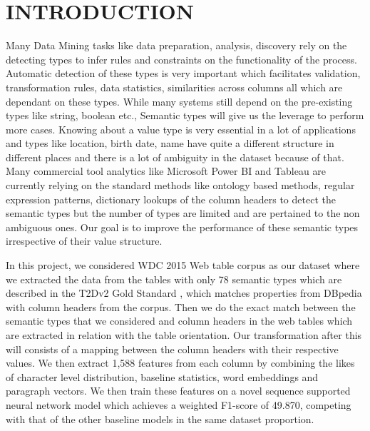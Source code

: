 \documentclass[12pt, a4paper]{report}
\theoremstyle{definition}
\numberwithin{equation}{chapter}
\numberwithin{figure}{chapter}
\numberwithin{table}{chapter}
\begin{document}
\chapter{INTRODUCTION}
\begin{spacing}{1.5}
\setlength{\parindent}{0em}
Many Data Mining tasks like data preparation, analysis, discovery rely on the detecting types to infer rules and constraints on the functionality of the process. Automatic detection of these types is very important which facilitates validation, transformation rules, data statistics, similarities across columns all which are dependant on these types. While many systems still depend on the pre-existing types like string, boolean etc., Semantic types will give us the leverage to perform more cases. Knowing about a value type is very essential in a lot of applications and types like location, birth date, name have quite a different structure in different places and there is a lot of ambiguity in the dataset because of that. Many commercial tool analytics like Microsoft Power BI \cite{powerbi} and Tableau \cite{tableau} are currently relying on the standard methods like ontology based methods, regular expression patterns, dictionary lookups of the column headers to detect the semantic types but the number of types are limited and are pertained to the non ambiguous ones. Our goal is to improve the performance of these semantic types irrespective of their value structure.
\par
\setlength{\parskip}{2.2em}
\setlength{\parindent}{0em}
In this project, we considered WDC 2015 Web table corpus \cite{wdc} as our dataset where we extracted the data from the tables with only 78 semantic types which are described in the T2Dv2 Gold Standard \cite{t2dv2}, which matches properties from DBpedia \cite{dbpedia, wttodbpedia} with column headers from the corpus. Then we do the exact match between the semantic types that we considered and column headers in the web tables which are extracted in relation with the table orientation. Our transformation after this will consists of a mapping between the column headers with their respective values. We then extract 1,588 features from each column by combining the likes of character level distribution, baseline statistics, word embeddings and paragraph vectors. We then train these features on a novel sequence supported neural network model which achieves a weighted F1-score of 49.870, competing with that of the other baseline models in the same dataset proportion.


\end{spacing}
\end{document}
